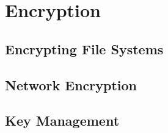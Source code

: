 \chapter{Encryption}\label{ch:encryption}
\section{Encrypting File Systems}
\section{Network Encryption}
\section{Key Management}
